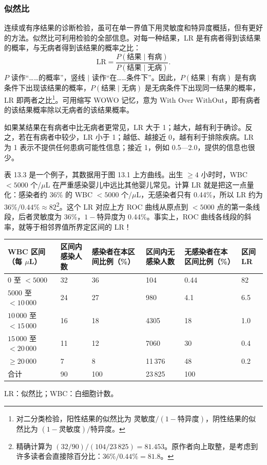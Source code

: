 \subsubsection{似然比}
连续或有序结果的诊断检验，虽可在单一界值下用灵敏度和特异度概括，但有更好的方法。似然比可利用检验的全部信息。对每一种结果，LR 是有病者得到该结果的概率，与无病者得到该结果的概率之比：
\[
\mathrm{LR}=\frac{P(\text{结果}\mid\text{有病})}{P(\text{结果}\mid\text{无病})}.
\]
$P$ 读作“……的概率”，竖线 $\mid$ 读作“在……条件下”。因此，$P(\text{结果}\mid\text{有病})$ 是有病条件下出现该结果的概率，$P(\text{结果}\mid\text{无病})$ 是无病条件下出现同一结果的概率，LR 即两者之比\footnote{对二分类检验，阳性结果的似然比为 $\text{灵敏度}/(1-\text{特异度})$，阴性结果的似然比为 $(1-\text{灵敏度})/\text{特异度}$。}。可用缩写 WOWO 记忆，意为 With Over WithOut，即有病者的该结果概率除以无病者的该结果概率。

如果某结果在有病者中比无病者更常见，LR 大于 1；越大，越有利于确诊。反之，若在有病者中较少，LR 小于 1；越低、越接近 0，越有利于排除疾病。LR 为 1 表示不提供任何患病可能性信息；接近 1，例如 0.5—2.0，提供的信息也很少。

表 13.3 是一个例子，其数据用于图 13.1 上方曲线。出生 $\geq4$ 小时时，WBC $<5000$ 个/$\mu$L 在严重感染婴儿中远比其他婴儿常见。计算 LR 就是把这一点量化：感染者约 36\% 的 WBC $<5000$ 个/$\mu$L，无感染者只有 0.44\%，所以 LR 约为 $36\%/0.44\%\approx82$\footnote{精确计算为 $(32/90)/(104/23\,825)=81.453$。原作者向上取整，是考虑到许多读者会直接除百分比：$36\%/0.44\%=81.8$。}。这个 LR 对应上方 ROC 曲线从原点到 $<5000$ 点的第一条线段，后者灵敏度为 36\%，$1-$特异度为 0.44\%。事实上，ROC 曲线各线段的斜率，就等于相邻界值所界定区间的 LR！

\begin{center}\small
{}
\begin{tabularx}{\linewidth}{L{30mm}Y Y Y Y Y}
\toprule WBC 区间（每 $\mu$L）&区间内感染人数&感染者在本区间比例（\%）&区间内无感染人数&无感染者在本区间比例（\%）&区间 LR\\\midrule
$0$ 至 $<5000$&32&36&104&0.44&82\\
$5000$ 至 $<10\,000$&24&27&980&4.1&6.5\\
$10\,000$ 至 $<15\,000$&16&18&4305&18&1.0\\
$15\,000$ 至 $<20\,000$&11&12&7060&30&0.4\\
$\geq20\,000$&7&8&11\,376&48&0.2\\
合计&90&100&23\,825&100&\\\bottomrule
\end{tabularx}\par\footnotesize LR：似然比；WBC：白细胞计数。
\end{center}

